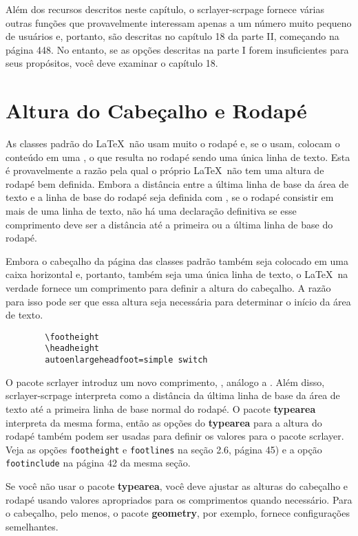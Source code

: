 Além dos recursos descritos neste capítulo, o scrlayer-scrpage fornece várias outras funções que provavelmente interessam apenas a um número muito pequeno de usuários e, portanto, são descritas no capítulo 18 da parte II, começando na página 448. No entanto, se as opções descritas na parte I forem insuficientes para seus propósitos, você deve examinar o capítulo 18.

\section{Altura do Cabeçalho e Rodapé}
As classes padrão do \LaTeX\ não usam muito o rodapé e, se o usam, colocam o conteúdo em uma , o que resulta no rodapé sendo uma única linha de texto. Esta é provavelmente a razão pela qual o próprio \LaTeX\ não tem uma altura de rodapé bem definida. Embora a distância entre a última linha de base da área de texto e a linha de base do rodapé seja definida com , se o rodapé consistir em mais de uma linha de texto, não há uma declaração definitiva se esse comprimento deve ser a distância até a primeira ou a última linha de base do rodapé.

Embora o cabeçalho da página das classes padrão também seja colocado em uma caixa horizontal e, portanto, também seja uma única linha de texto, o \LaTeX\ na verdade fornece um comprimento para definir a altura do cabeçalho. A razão para isso pode ser que essa altura seja necessária para determinar o início da área de texto.
\begin{verbatim}
        \footheight
        \headheight
        autoenlargeheadfoot=simple switch
\end{verbatim}

O pacote scrlayer introduz um novo comprimento, , análogo a . Além disso, scrlayer-scrpage interpreta  como a distância da última linha de base da área de texto até a primeira linha de base normal do rodapé. O pacote \textbf{typearea} interpreta  da mesma forma, então as opções do \textbf{typearea} para a altura do rodapé também podem ser usadas para definir os valores para o pacote scrlayer. Veja as opções \texttt{footheight} e \texttt{footlines} na seção 2.6, página 45) e a opção \texttt{foot\-inclu\-de} na página 42 da mesma seção.

Se você não usar o pacote \textbf{typearea}, você deve ajustar as alturas do cabeçalho e rodapé usando valores apropriados para os comprimentos quando necessário. Para o cabeçalho, pelo menos, o pacote \textbf{geometry}, por exemplo, fornece configurações semelhantes.

